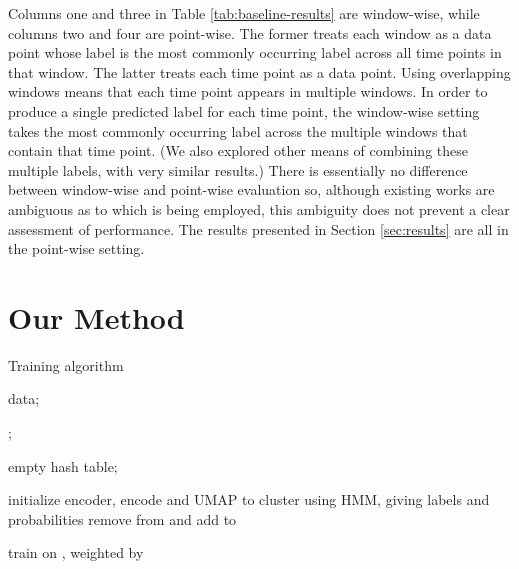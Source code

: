\documentclass[wcp]{jmlr}
\begin{document}
Columns one and three in Table \ref{tab:baseline-results} are window-wise, while columns two and four are point-wise. The former treats each window as a data point whose label is the most commonly occurring label across all time points in that window. The latter treats each time point as a data point. Using overlapping windows means that each time point appears in multiple windows. In order to produce a single predicted label for each time point, the window-wise setting takes the most commonly occurring label across the multiple windows that contain that time point. (We also explored other means of combining these multiple labels, with very similar results.) There is essentially no difference between window-wise and point-wise evaluation so, although existing works are ambiguous as to which is being employed, this ambiguity does not prevent a clear assessment of performance. The results presented in Section \ref{sec:results} are all in the point-wise setting.


\section{Our Method} \label{sec:method}
 
\begin{algorithm}[t]
\caption {Training algorithm} \label{alg:method}
 data;

 ;

 empty hash table;
 {
    \For{} {
         initialize encoder, encode  and UMAP to 
         cluster using HMM, giving labels  and probabilities 
        \For{} {
             {
                 remove  from  and 
                }
            { add  to }
        }
        \For{} {
            \For {} {
                \uElseIf{} {
                     train on , weighted by 
                }
            }
         
        }
    }
    \For {} {
         
    }
}
\For{} {
         
}
\end{algorithm}
\end{document}
